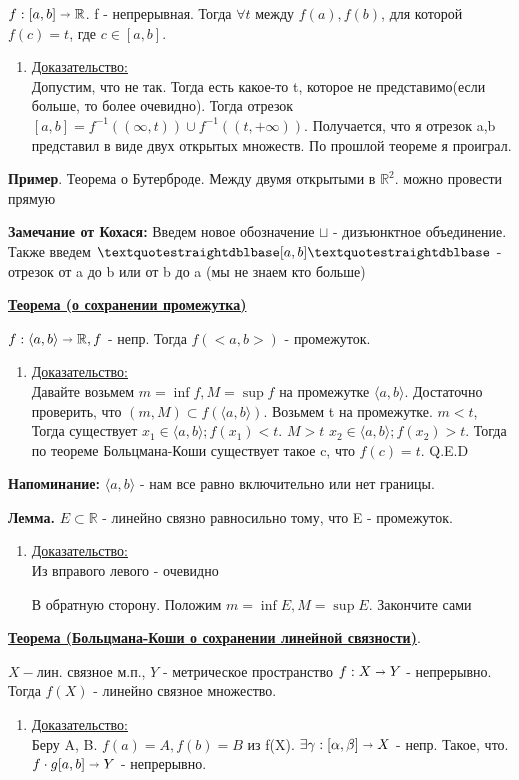 \documentclass{article}
\newcommand{\thmm}[1]{\underline{\textbf{#1}}}
\newcommand{\prooff}[1]{{\underline{Доказательство:}} \\ }
\begin{document}
$f: [a,b] \shortrightarrow \mathbb{R}$. f - непрерывная. Тогда $\forall t$ между $f(a),f(b)$, для которой $f(c) = t$, где $c \in [a,b]$.

\begin{enumerate}
    \item[] \prooff{}
    Допустим, что не так. Тогда есть какое-то t, которое не представимо(если больше, то более очевидно). Тогда отрезок $[a,b] = f^{-1}((\infty,t)) \cup f^{-1}((t,+\infty))$. Получается, что я отрезок a,b представил в виде двух открытых множеств. По прошлой теореме я проиграл.
\end{enumerate}

\textbf{Пример}. Теорема о Бутерброде. Между двумя открытыми в $\mathbb{R}^2$. можно провести прямую


\textbf{Замечание от Кохася:} Введем новое обозначение $\sqcup$ - дизъюнктное объединение. Также введем $\textquotestraightdblbase[a,b]\textquotestraightdblbase$ - отрезок от a до b или от b до a (мы не знаем кто больше)

\thmm{Теорема (о сохранении промежутка)}

$f: \langle a,b \rangle \shortrightarrow \mathbb{R}, f $ - непр. Тогда $f(<a,b>)$ - промежуток.
\begin{enumerate}
    \item[] \prooff{}
    Давайте возьмем  $m = \inf f, M = \sup f$ на промежутке $\langle a,b \rangle$. Достаточно проверить, что $(m,M) \subset f( \langle a,b \rangle )$.  Возьмем t на промежутке. $m<t$,  Тогда существует $x_1 \in \langle a,b \rangle; f(x_1)<t$. $M>t$  $x_2 \in  \langle a,b \rangle; f(x_2)>t$. Тогда по теореме Больцмана-Коши существует такое c, что $f(c) =t$. Q.E.D 
\end{enumerate}

\textbf{Напоминание:} $\langle a,b \rangle$ - нам все равно включительно или нет границы.

\textbf{Лемма.} $E \subset \mathbb{R}$ - линейно связно равносильно тому, что E - промежуток. 

\begin{enumerate}
    \item[] \prooff{}
    Из вправого левого - очевидно

    В обратную сторону.  Положим $m = \inf E, M = \sup E$. Закончите сами  %
\end{enumerate}

\thmm{Теорема (Больцмана-Коши о сохранении линейной связности)}.

$X - $лин. связное м.п., $Y$ - метрическое пространство $f: X \shortrightarrow Y$ - непрерывно. Тогда $f(X)$ - линейно связное множество.
\begin{enumerate}
    \item[] \prooff{}
   Беру A, B. $f(a) = A, f(b) = B$ из f(X). $\exists \gamma: [\alpha,\beta] \shortrightarrow X$ - непр. Такое, что. $f \cdot g [a,b] \shortrightarrow Y$ - непрерывно.
\end{enumerate}
\end{document}
